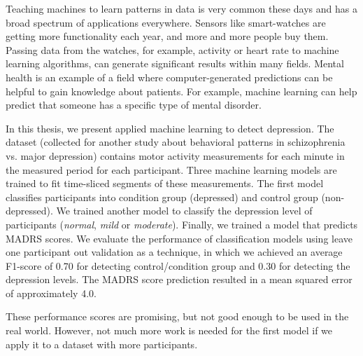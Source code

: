 Teaching machines to learn patterns in data is very common these days and has a broad spectrum of applications everywhere. Sensors like smart-watches are getting more functionality each year, and more and more people buy them. Passing data from the watches, for example, activity or heart rate to machine learning algorithms, can generate significant results within many fields. Mental health is an example of a field where computer-generated predictions can be helpful to gain knowledge about patients. For example, machine learning can help predict that someone has a specific type of mental disorder.

In this thesis, we present applied machine learning to detect depression. The dataset (collected for another study about behavioral patterns in schizophrenia vs. major depression) contains motor activity measurements for each minute in the measured period for each participant. Three machine learning models are trained to fit time-sliced segments of these measurements. The first model classifies participants into  condition group (depressed) and control group (non-depressed). We trained another model to classify the depression level of participants (\emph{normal}, \emph{mild} or \emph{moderate}). Finally, we trained a model that predicts MADRS scores. We evaluate the performance of classification models using leave one participant out validation as a technique, in which we achieved an average F1-score of 0.70 for detecting control/condition group and 0.30 for detecting the depression levels. The MADRS score prediction resulted in a mean squared error of approximately 4.0. 

These performance scores are promising, but not good enough to be used in the real world. However, not much more work is needed for the first model if we apply it to a dataset with more participants.